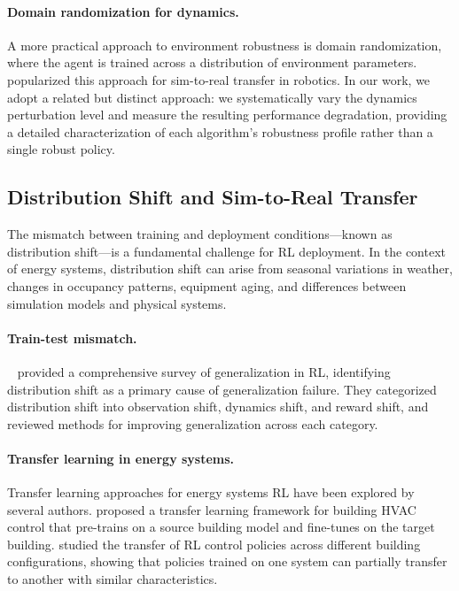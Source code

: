 \paragraph{Domain randomization for dynamics.} A more practical approach to environment robustness is domain randomization, where the agent is trained across a distribution of environment parameters.~\citet{tobin2017domain} popularized this approach for sim-to-real transfer in robotics. In our work, we adopt a related but distinct approach: we systematically vary the dynamics perturbation level and measure the resulting performance degradation, providing a detailed characterization of each algorithm's robustness profile rather than a single robust policy.

\subsection{Distribution Shift and Sim-to-Real Transfer}

The mismatch between training and deployment conditions---known as distribution shift---is a fundamental challenge for RL deployment. In the context of energy systems, distribution shift can arise from seasonal variations in weather, changes in occupancy patterns, equipment aging, and differences between simulation models and physical systems.

\paragraph{Train-test mismatch.}~\citet{kirk2023survey_generalization} provided a comprehensive survey of generalization in RL, identifying distribution shift as a primary cause of generalization failure. They categorized distribution shift into observation shift, dynamics shift, and reward shift, and reviewed methods for improving generalization across each category.

\paragraph{Transfer learning in energy systems.} Transfer learning approaches for energy systems RL have been explored by several authors. \citet{zhang2020transfer_hvac} proposed a transfer learning framework for building HVAC control that pre-trains on a source building model and fine-tunes on the target building. \citet{dey2020transfer_ev} studied the transfer of RL control policies across different building configurations, showing that policies trained on one system can partially transfer to another with similar characteristics.

